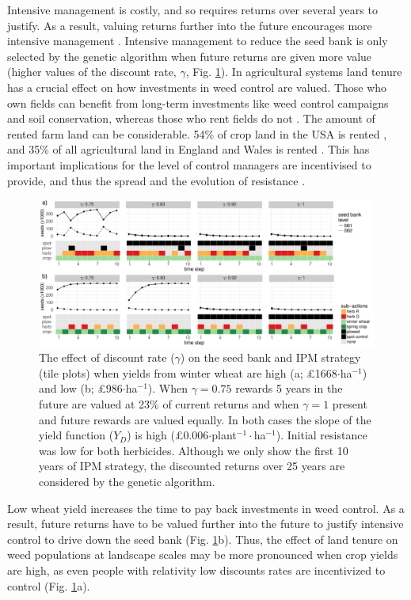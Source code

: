 \documentclass[12pt, a4paper]{article}
\begin{document}
Intensive management is costly, and so requires returns over several years to justify. As a result, valuing returns further into the future encourages more intensive management \citep{EpanN2010}. Intensive management to reduce the seed bank is only selected by the genetic algorithm when future returns are given more value (higher values of the discount rate, $\gamma$, Fig. \ref{fig:dis_rate}). In agricultural systems land tenure has a crucial effect on how investments in weed control are valued. Those who own fields can benefit from long-term investments like weed control campaigns and soil conservation, whereas those who rent fields do not \citep{Wies1996, Fras2004}. The amount of rented farm land can be considerable. 54\% of crop land in the USA is rented \citep{Bige2016}, and 35\% of all agricultural land in England and Wales is rented \citep{CAAV2017}. This has important implications for the level of control managers are incentivised to provide, and thus the spread and the evolution of resistance \citep{Mare2012}.       
\begin{figure}
	\includegraphics[width=178mm]{MS_figs/dis_rate_SB_strat.pdf}
	\caption{The effect of discount rate ($\gamma$) on the seed bank and IPM strategy (tile plots) when yields from winter wheat are high (a; \pounds 1668$\cdot$ha$^{-1}$) and low (b; \pounds 986$\cdot$ha$^{-1}$). When $\gamma = 0.75$ rewards 5 years in the future are valued at 23\% of current returns and when $\gamma = 1$ present and future rewards are valued equally. In both cases the slope of the yield function ($Y_D$) is high (\pounds 0.006$\cdot$plant$^{-1}\cdot$ha$^{-1}$). Initial resistance was low for both herbicides. Although we only show the first 10 years of IPM strategy, the discounted returns over 25 years are considered by the genetic algorithm.}
	\label{fig:dis_rate} 
\end{figure}

Low wheat yield increases the time to pay back investments in weed control. As a result, future returns have to be valued further into the future to justify intensive control to drive down the seed bank (Fig. \ref{fig:dis_rate}b). Thus, the effect of land tenure on weed populations at landscape scales may be more pronounced when crop yields are high, as even people with relativity low discounts rates are incentivized to control (Fig. \ref{fig:dis_rate}a).
\end{document}
